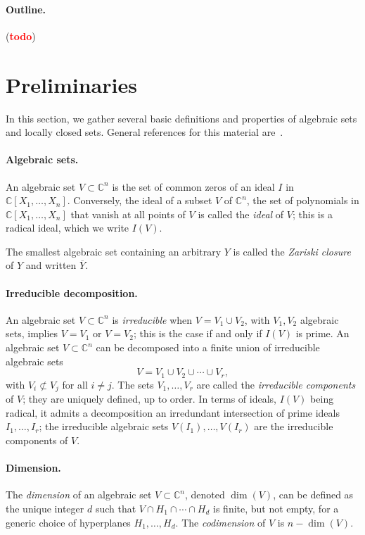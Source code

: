 \documentclass[12pt]{article}
\def\C{\mathbb{C}}
\def\td{(\textcolor{red}{{\bf todo}})}
\begin{document}
\paragraph*{Outline.} \td


\section{Preliminaries}

In this section, we gather several basic definitions and properties of
algebraic sets and locally closed sets. General references for this
material are~\cite{Mumford76,Shafarevich77,ECA}.

\paragraph*{Algebraic sets.} An algebraic set $V \subset \C^n$ is the set of common 
zeros of an ideal $I$ in $\C[X_1,\hdots,X_n].$ Conversely, the ideal
of a subset $V$ of $\C^n$, the set of polynomials in
$\C[X_1,\dots,X_n]$ that vanish at all points of $V$ is called the
\textit{ideal} of $V$; this is a radical ideal, which we write $I(V)$.

The smallest algebraic set containing an arbitrary $Y$ is called 
the {\em Zariski closure} of $Y$ and written $\overline Y$.

\paragraph*{Irreducible decomposition.}
An algebraic set $V \subset \C^n$ is \textit{irreducible} when $V =
V_1 \cup V_2$, with $V_1,V_2$ algebraic sets, implies $V=V_1$ or
$V=V_2$; this is the case if and only if $I(V)$ is prime.  An
algebraic set $V \subset \C^n$ can be decomposed into a finite union
of irreducible algebraic sets
\[
V = V_1 \cup V_2 \cup \cdots \cup V_r,
\]
with $V_i \not \subset V_j$ for all $i \ne j$. The sets
$V_1,\dots,V_r$ are called the {\em irreducible components} of $V$;
they are uniquely defined, up to order. In terms of ideals, $I(V)$
being radical, it admits a decomposition an irredundant intersection
of prime ideals $I_1,\dots,I_r$; the irreducible algebraic sets
$V(I_1),\dots,V(I_r)$ are the irreducible components of $V$.

\paragraph*{Dimension.}
The \textit{dimension} of an algebraic set $V \subset \C^n$, denoted
$\dim(V)$, can be defined as the unique integer $d$ such that $V \cap
H_1 \cap \cdots \cap H_d$ is finite, but not empty, for a generic
choice of hyperplanes $H_1,\dots,H_d$. The \textit{codimension} of $V$
is $n - \dim (V)$. 
\end{document}
